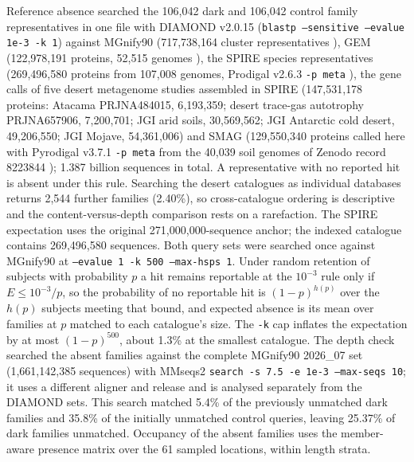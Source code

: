Reference absence searched the 106{,}042 dark and 106{,}042 control family representatives in one
file with DIAMOND v2.0.15 (\texttt{blastp --sensitive --evalue 1e-3 -k 1}) against MGnify90
(717{,}738{,}164 cluster representatives \citep{richardson2023mgnify}), GEM (122{,}978{,}191
proteins, 52{,}515 genomes \citep{nayfach2021gem}), the SPIRE species representatives (269{,}496{,}580
proteins from 107{,}008 genomes, Prodigal v2.6.3 \texttt{-p meta} \citep{schmidt2024spire}), the
gene calls of five desert metagenome studies assembled in SPIRE (147{,}531{,}178 proteins: Atacama
PRJNA484015, 6{,}193{,}359; desert trace-gas autotrophy PRJNA657906, 7{,}200{,}701; JGI arid soils,
30{,}569{,}562; JGI Antarctic cold desert, 49{,}206{,}550; JGI Mojave, 54{,}361{,}006) and SMAG
(129{,}550{,}340 proteins called here with Pyrodigal v3.7.1 \texttt{-p meta} from the 40{,}039 soil genomes of
Zenodo record 8223844 \citep{ma2023smag}); 1.387 billion sequences in total. A
representative with no reported hit is absent under this rule. Searching the desert catalogues
as individual databases returns 2{,}544 further families (2.40\%), so cross-catalogue
ordering is descriptive and the content-versus-depth comparison rests on a rarefaction. The SPIRE expectation uses the original 271{,}000{,}000-sequence anchor; the indexed catalogue contains 269{,}496{,}580 sequences. Both query
sets were searched once against MGnify90 at \texttt{--evalue 1 -k 500 --max-hsps 1}. Under random
retention of subjects with probability $p$ a hit remains reportable at the $10^{-3}$ rule only if
$E \leq 10^{-3}/p$, so the probability of no reportable hit is $(1-p)^{h(p)}$ over the $h(p)$ subjects
meeting that bound, and expected absence is its mean over families at $p$ matched to each catalogue's
size. The \texttt{-k} cap inflates the expectation by at most $(1-p)^{500}$, about 1.3\% at the
smallest catalogue. The depth check searched the absent families against the complete MGnify90
2026\_07 set (1{,}661{,}142{,}385 sequences) with MMseqs2 \texttt{search -s 7.5 -e 1e-3 --max-seqs 10};
it uses a different aligner and release and is analysed separately from the DIAMOND sets. This search matched 5.4\% of the previously unmatched dark families and 35.8\% of the initially unmatched control queries, leaving 25.37\% of dark families unmatched. Occupancy of the
absent families uses the member-aware presence matrix over the 61 sampled locations, within length strata.

